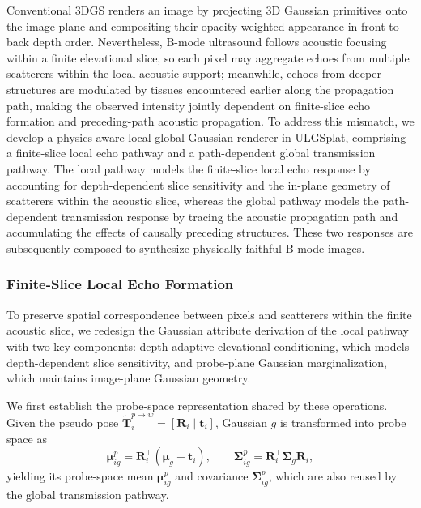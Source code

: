 Conventional 3DGS renders an image by projecting 3D Gaussian primitives onto
the image plane and compositing their opacity-weighted appearance in
front-to-back depth order. Nevertheless, B-mode ultrasound follows acoustic
focusing within a finite elevational slice, so each pixel may aggregate echoes
from multiple scatterers within the local acoustic support; meanwhile, echoes
from deeper structures are modulated by tissues encountered earlier along the
propagation path, making the observed intensity jointly dependent on
finite-slice echo formation and preceding-path acoustic propagation.
To address this mismatch, we develop a physics-aware local-global Gaussian
renderer in ULGSplat, comprising a finite-slice local echo pathway and a
path-dependent global transmission pathway. The local pathway models the
finite-slice local echo response by accounting for depth-dependent slice
sensitivity and the in-plane geometry of scatterers within the acoustic slice,
whereas the global pathway models the path-dependent transmission response by
tracing the acoustic propagation path and accumulating the effects of causally
preceding structures. These two responses are subsequently composed to
synthesize physically faithful B-mode images.

\subsubsection{Finite-Slice Local Echo Formation}

To preserve spatial correspondence between pixels and scatterers
within the finite acoustic slice, we redesign the Gaussian attribute derivation
of the local pathway with two key components: depth-adaptive elevational
conditioning, which models depth-dependent slice sensitivity, and probe-plane
Gaussian marginalization, which maintains image-plane Gaussian geometry.

We first establish the probe-space representation shared by these operations.
Given the pseudo pose
$\widetilde{\mathbf T}_i^{p\rightarrow w}
=[\mathbf R_i\mid\mathbf t_i]$,
Gaussian $g$ is transformed into probe space as
\begin{equation}
\boldsymbol\mu^{p}_{ig}
=
\mathbf R_i^\top
\left(
\boldsymbol\mu_g-\mathbf t_i
\right),
\qquad
\boldsymbol\Sigma^{p}_{ig}
=
\mathbf R_i^\top
\boldsymbol\Sigma_g
\mathbf R_i,
\label{eq:probe-space-gaussian}
\end{equation}
yielding its probe-space mean
$\boldsymbol\mu^{p}_{ig}$ and covariance
$\boldsymbol\Sigma^{p}_{ig}$, which are also reused by the global transmission
pathway.

